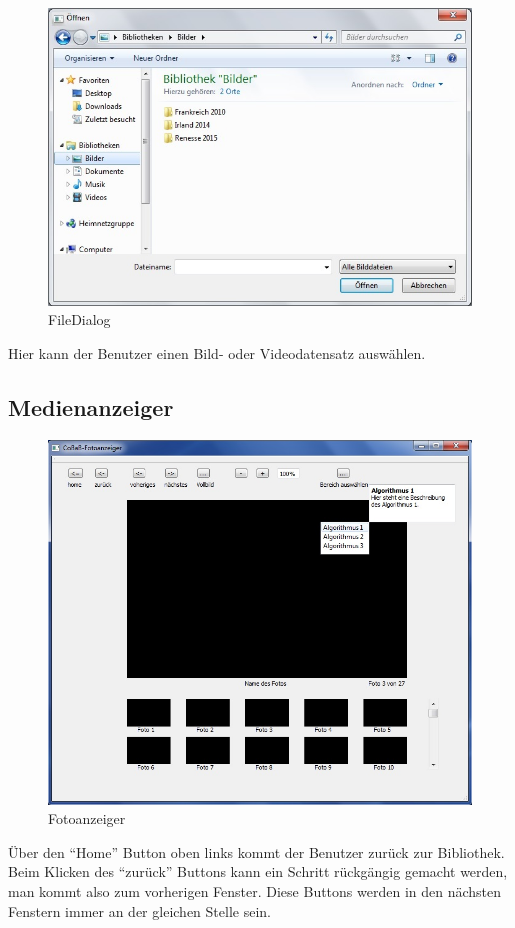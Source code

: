 \begin{figure}[H]
\includegraphics[width=1\linewidth]{img/FileChooser}
\caption{FileDialog}
\label{fig:filedialog}
\end{figure}
Hier kann der Benutzer einen Bild- oder Videodatensatz auswählen.

\subsection{Medienanzeiger}
\begin{figure}[H]
\includegraphics[width=1\linewidth]{img/Fotoanzeiger}
\caption{Fotoanzeiger}
\label{fig:fotoanzeiger}
\end{figure}
Über den \enquote{Home} Button oben links kommt der Benutzer zurück zur Bibliothek. Beim Klicken des \enquote{zurück} Buttons kann ein Schritt rückgängig gemacht werden, man kommt also zum vorherigen Fenster. Diese Buttons werden in den nächsten Fenstern immer an der gleichen Stelle sein.

